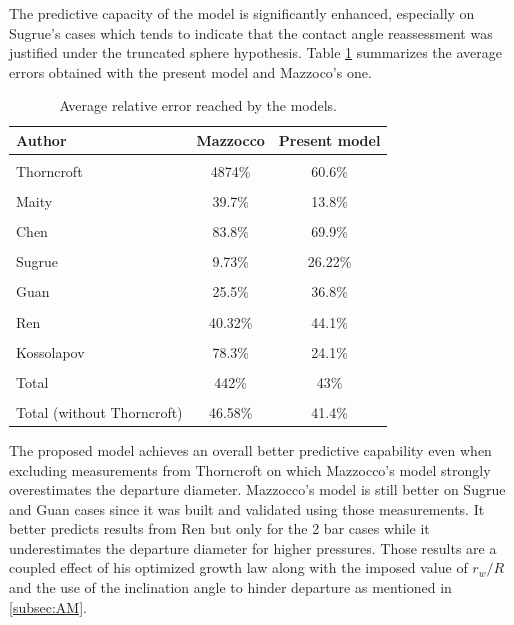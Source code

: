 The predictive capacity of the model is significantly enhanced, especially on Sugrue's cases which tends to indicate that the contact angle reassessment was justified under the truncated sphere hypothesis. Table \ref{tab:mod_errors} summarizes the average errors obtained with the present model and Mazzoco's one.



\begin{table}[h!]

\scriptsize
\centering
\begin{tabular}[b]{p{30mm}|c c } 
Author & Mazzocco & Present model\\
\hline
\\
Thorncroft & 4874\% & 60.6\% \\
\\
Maity & 39.7\% & 13.8\%  \\
\\
Chen & 83.8\% & 69.9\% \\
\\
Sugrue & 9.73\% & 26.22\% \\
\\
Guan & 25.5\% & 36.8\% \\
\\
Ren & 40.32\% & 44.1\% \\
\\
Kossolapov & 78.3\% & 24.1\% \\
\\
Total & 442\% & 43\%\\
\\
Total \newline (without Thorncroft) & {46.58\%} & {41.4\%}\\
\hline
\end{tabular}
\caption{Average relative error reached by the models.}
\label{tab:mod_errors}
\end{table}


The proposed model achieves an overall better predictive capability even when excluding measurements from Thorncroft on which Mazzocco's model strongly overestimates the departure diameter. Mazzocco's model is still better on Sugrue and Guan cases since it was built and validated using those measurements. It better predicts results from Ren but only for the 2 bar cases while it underestimates the departure diameter for higher pressures. Those results are a coupled effect of his optimized growth law along with the imposed value of $r_{w}/R$ and the use of the inclination angle to hinder departure as mentioned in \ref{subsec:AM}.

